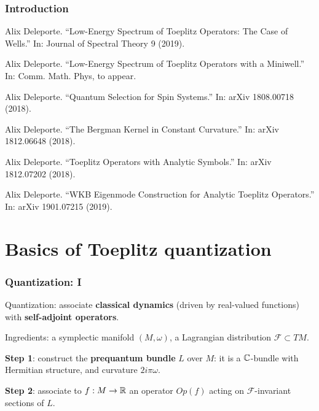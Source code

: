 \documentclass[mathserif]{beamer}
\begin{document}
      \begin{frame}
        \frametitle{Introduction}
        {\footnotesize
        \begin{description}
        \item<1>[{[D. 2019a]}] Alix Deleporte. “Low-Energy Spectrum of Toeplitz Operators: The Case
of Wells.” In: Journal of Spectral Theory 9 (2019).
\item<1-2> [{[D. 2019b]}] Alix Deleporte. “Low-Energy Spectrum of Toeplitz Operators with a
Miniwell.” In: Comm. Math. Phys, to appear.
\item<1>[{[D. 2018a++]}] Alix Deleporte. “Quantum Selection for Spin Systems.” In: arXiv
1808.00718 (2018).
\item<1>[{[D. 2018b++]}] Alix Deleporte. “The Bergman Kernel in Constant Curvature.” In:
arXiv 1812.06648 (2018).
\item<1>[{[D. 2018c++]}] Alix Deleporte. “Toeplitz Operators with Analytic Symbols.” In: arXiv
1812.07202 (2018).
\item<1>[{[D. 2019++]}] Alix Deleporte. “WKB Eigenmode Construction for Analytic Toeplitz
  Operators.” In: arXiv 1901.07215 (2019).
        \end{description}}
      \end{frame}

      

\section{Basics of Toeplitz quantization}
\begin{frame}
  \frametitle{Quantization: I}
  Quantization: associate {\bf classical dynamics} (driven by
  real-valued functions) with {\bf self-adjoint operators}.

Ingredients: a symplectic manifold $(M,\omega)$, a Lagrangian
distribution $\mathcal{F}\subset TM$.

\vfill

{\bfseries Step 1}: construct the {\bfseries prequantum bundle} $L$
over $M$: it is a $\mathbb{C}$-bundle with Hermitian structure, and curvature
$2i\pi \omega$.

{\bfseries Step 2}: associate to $f:M\to \mathbb{R}$ an operator $Op(f)$
acting on $\mathcal{F}$-invariant sections of $L$.
\end{frame}
\end{document}
